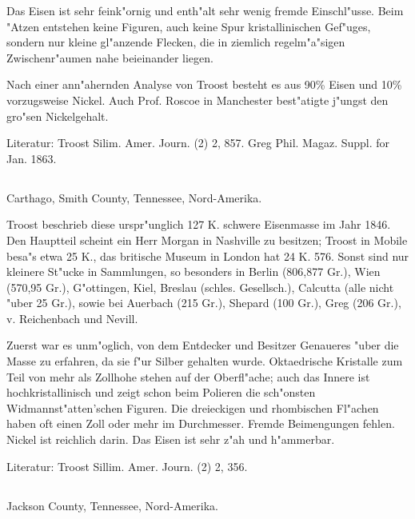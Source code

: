 \documentclass[a4paper, 11pt, oneside]{article}
\begin{document}
Das Eisen ist sehr feink"ornig und enth"alt sehr wenig fremde Einschl"usse. Beim "Atzen entstehen keine Figuren, auch keine Spur kristallinischen Gef"uges, sondern nur kleine gl"anzende Flecken, die in ziemlich regelm"a"sigen Zwischenr"aumen nahe beieinander liegen.

Nach einer ann"ahernden Analyse von Troost besteht es aus 90\% Eisen und 10\% vorzugsweise Nickel. Auch Prof. Roscoe in Manchester best"atigte j"ungst den gro"sen Nickelgehalt.

\normalsize
Literatur: Troost Silim. Amer. Journ. (2) 2, 857. Greg Phil. Magaz. Suppl. for Jan. 1863.

\subsection{}
\LARGE
\paragraph{}
Carthago, Smith County, Tennessee, Nord-Amerika.

Troost beschrieb diese urspr"unglich 127 K. schwere Eisenmasse im Jahr 1846. Den Hauptteil scheint ein Herr Morgan in Nashville zu besitzen; Troost in Mobile besa"s etwa 25 K., das britische Museum in London hat 24 K. 576. Sonst sind nur kleinere St"ucke in Sammlungen, so besonders in Berlin (806,877 Gr.), Wien (570,95 Gr.), G"ottingen, Kiel, Breslau (schles. Gesellsch.), Calcutta (alle nicht "uber 25 Gr.), sowie bei Auerbach (215 Gr.), Shepard (100 Gr.), Greg (206 Gr.), v. Reichenbach und Nevill.

Zuerst war es unm"oglich, von dem Entdecker und Besitzer Genaueres "uber die Masse zu erfahren, da sie f"ur Silber gehalten wurde. Oktaedrische Kristalle zum Teil von mehr als Zollhohe stehen auf der Oberfl"ache; auch das Innere ist hochkristallinisch und zeigt schon beim Polieren die sch"onsten Widmannst"atten'schen Figuren. Die dreieckigen und rhombischen Fl"achen haben oft einen Zoll oder mehr im Durchmesser. Fremde Beimengungen fehlen. Nickel ist reichlich darin. Das Eisen ist sehr z"ah und h"ammerbar.

\normalsize
Literatur: Troost Sillim. Amer. Journ. (2) 2, 356.

\subsection{}
\LARGE
\paragraph{}
Jackson County, Tennessee, Nord-Amerika.
\end{document}

